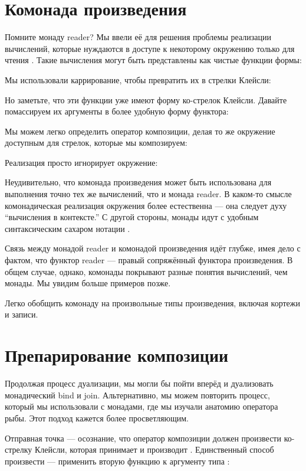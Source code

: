 \section{Комонада произведения}

Помните монаду reader? Мы ввели её для решения проблемы
реализации вычислений, которые нуждаются в доступе к некоторому окружению только для чтения
. Такие вычисления могут быть представлены как чистые функции
формы:

Мы использовали каррирование, чтобы превратить их в стрелки Клейсли:

Но заметьте, что эти функции уже имеют форму ко-стрелок
Клейсли. Давайте помассируем их аргументы в более удобную форму функтора:

Мы можем легко определить оператор композиции, делая то же
окружение доступным для стрелок, которые мы композируем:

Реализация  просто игнорирует окружение:

Неудивительно, что комонада произведения может быть использована для выполнения точно тех же
вычислений, что и монада reader. В каком-то смысле комонадическая
реализация окружения более естественна --- она следует
духу ``вычисления в контексте.'' С другой стороны, монады идут
с удобным синтаксическим сахаром нотации .

Связь между монадой reader и комонадой произведения идёт
глубже, имея дело с фактом, что функтор reader --- правый
сопряжённый функтора произведения. В общем случае, однако, комонады покрывают
разные понятия вычислений, чем монады. Мы увидим больше примеров
позже.

Легко обобщить комонаду  на произвольные
типы произведения, включая кортежи и записи.

\section{Препарирование композиции}

Продолжая процесс дуализации, мы могли бы пойти вперёд и дуализовать
монадический bind и join. Альтернативно, мы можем повторить процесс, который мы использовали
с монадами, где мы изучали анатомию оператора рыбы. Этот
подход кажется более просветляющим.

Отправная точка --- осознание, что оператор композиции должен
произвести ко-стрелку Клейсли, которая принимает  и производит
. Единственный способ произвести  --- применить вторую
функцию к аргументу типа :

